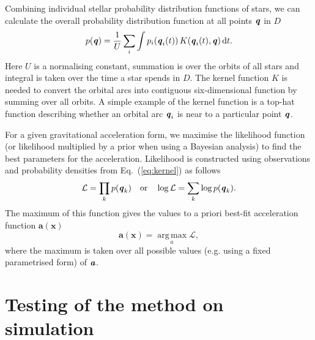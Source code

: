 \documentclass[fleqn,usenatbib]{mnras}
\begin{document}
Combining individual stellar probability distribution functions of stars, we can calculate the overall probability distribution function at all points $\textbf{\textit{q}}$ in $D$
\begin{equation}
p(\textbf{\textit{q}}) = \frac{1}{U} \sum\limits_{i}\int p_i(\textbf{\textit{q}}_i(t))\, K(\textbf{\textit{q}}_i(t), \textbf{\textit{q}})\, \text{d}t. \label{eq:kernel}
\end{equation}
Here $U$ is a normalising constant, summation is over the orbits of all stars and integral is taken over the time a star spends in $D$. The kernel function $K$ is needed to convert the orbital arcs into contiguous six-dimensional function by summing over all orbits. A simple example of the kernel function is a top-hat function describing whether an orbital arc $\textbf{\textit{q}}_i$ is near to a particular point $\textbf{\textit{q}}$.

For a given gravitational acceleration form, we maximise the likelihood function (or likelihood multiplied by a prior when using a Bayesian analysis) to find the best parameters for the acceleration. Likelihood is constructed using observations and probability densities from Eq.~(\ref{eq:kernel}) as follows
\begin{equation}
	\mathcal{L} = \prod\limits_k p (\textbf{\textit{q}}_k) \quad \mathrm{or} \quad \log \mathcal{L} = \sum\limits_k \log p (\textbf{\textit{q}}_k). \label{eq:likelihood}
\end{equation}
The maximum of this function gives the values to a priori best-fit acceleration function $\textbf{a}(\textbf{x})$
\begin{equation}
\textbf{a}(\textbf{x}) = \operatorname*{arg\,max}_{a} \mathcal{L},
\end{equation}
where the maximum is taken over all possible values (e.g. using a fixed parametrised form) of $\textbf{\textit{a}}$.



\section{Testing of the method on simulation} 
\label{sec:testing_the_method}
\end{document}
